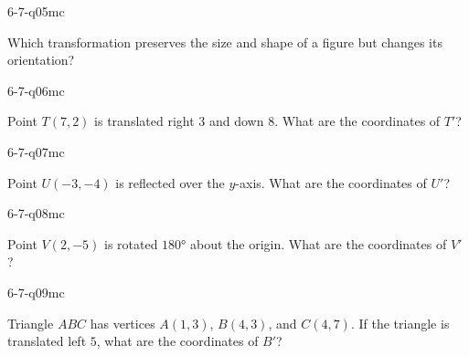 \begin{practiceQuestion}{6-7-q05}{mc}
\begin{questionText}
Which transformation preserves the size and shape of a figure but changes its orientation?
\end{questionText}
\end{practiceQuestion}

\begin{practiceQuestion}{6-7-q06}{mc}
\begin{questionText}
Point $T(7, 2)$ is translated right $3$ and down $8$. What are the coordinates of $T'$?
\end{questionText}
\end{practiceQuestion}

\begin{practiceQuestion}{6-7-q07}{mc}
\begin{questionText}
Point $U(-3, -4)$ is reflected over the $y$-axis. What are the coordinates of $U'$?
\end{questionText}
\end{practiceQuestion}

\begin{practiceQuestion}{6-7-q08}{mc}
\begin{questionText}
Point $V(2, -5)$ is rotated $180°$ about the origin. What are the coordinates of $V'$?
\end{questionText}
\end{practiceQuestion}

\begin{practiceQuestion}{6-7-q09}{mc}
\begin{questionText}
Triangle $ABC$ has vertices $A(1, 3)$, $B(4, 3)$, and $C(4, 7)$. If the triangle is translated left $5$, what are the coordinates of $B'$?
\end{questionText}
\end{practiceQuestion}

